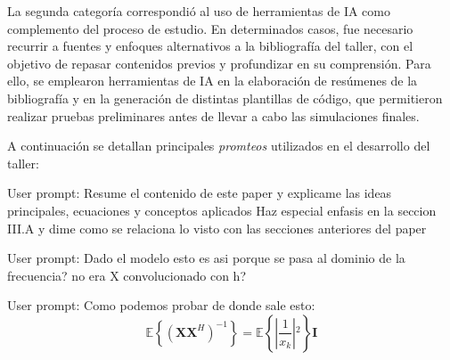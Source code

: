 \documentclass[a4paper]{article}
\begin{document}
La segunda categoría correspondió al uso de herramientas de IA como complemento del proceso de estudio. En determinados casos, fue necesario recurrir a fuentes y enfoques alternativos a la bibliografía del taller, con el objetivo de repasar contenidos previos y profundizar en su comprensión. Para ello, se emplearon herramientas de IA en la elaboración de resúmenes de la bibliografía y en la generación de distintas plantillas de código, que permitieron realizar pruebas preliminares antes de llevar a cabo las simulaciones finales.

A continuación se detallan principales \textit{promteos} utilizados en el desarrollo del taller:

\begin{tcolorbox}[colframe=black!50,title=Elaboración de resúmenen \cite{edfors1996} ]
	User prompt: Resume el contenido de este paper y explicame las ideas principales, ecuaciones y conceptos aplicados Haz especial enfasis en la seccion III.A y dime como se relaciona lo visto con las secciones anteriores del paper
\end{tcolorbox}



\begin{tcolorbox}[colframe=black!50,title= Consulta acerca del documento \cite{edfors1996}.]
 	 User prompt: Dado el modelo  esto es asi porque se pasa al dominio de la frecuencia? no era X convolucionado con h?
\end{tcolorbox}


\begin{tcolorbox}[colframe=black!50,title= Consulta acerca del documento \cite{edfors1996}.]
	User prompt: Como podemos probar de donde sale esto: $$\mathbb{E}\left\{(\mathbf{X}\mathbf{X}^H)^{-1}\right\} = \mathbb{E}\left\{\left\vert{}\frac{1}{x_k}\right\vert{}^2\right\}\mathbf{I}$$
\end{tcolorbox}

\printbibliography
 
\end{document}
